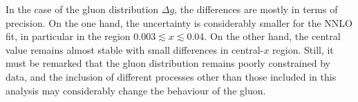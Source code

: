 

In the case of the gluon distribution $\Delta g$, the differences are mostly in terms of precision. On the one hand, the uncertainty is considerably smaller for the NNLO fit, in particular in the region $0.003 \lesssim x \lesssim 0.04$. On the other hand, the central value remains almost stable with small differences in central-$x$ region. Still, it must be remarked that the gluon distribution remains poorly constrained by data, and the inclusion of different processes other than those included in this analysis may considerably change the behaviour of the gluon.%

